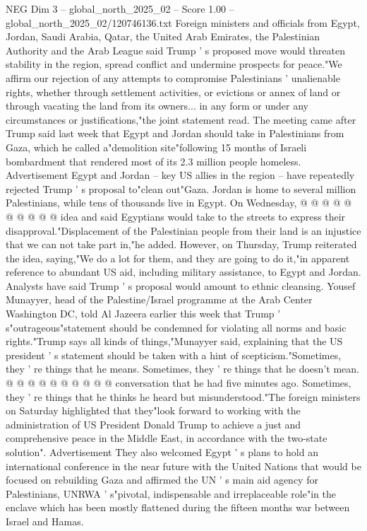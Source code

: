 \begin{textsample}{NEG Dim 3 – global\_north\_2025\_02 – Score 1.00 – global\_north\_2025\_02/120746136.txt}  \label{ex:f3_neg_172}
Foreign ministers and officials from Egypt, Jordan, Saudi Arabia, Qatar, the United Arab Emirates, the Palestinian Authority and the Arab League said Trump ' s proposed move would threaten stability in the region, spread conflict and undermine prospects for peace."We affirm our rejection of any attempts to compromise Palestinians ' unalienable rights, whether through settlement activities, or evictions or annex of land or through vacating the land from its owners... in any form or under any circumstances or justifications,"the joint statement read.
The meeting came after Trump said last week that Egypt and Jordan should take in Palestinians from Gaza, which he called a"demolition site"following 15 months of Israeli bombardment that rendered most of its 2.3 million people homeless.
Advertisement Egypt and Jordan -- key US allies in the region -- have repeatedly rejected Trump ' s proposal to"clean out"Gaza.
Jordan is home to several million Palestinians, while tens of thousands live in Egypt.
On Wednesday, @ @ @ @ @ @ @ @ @ @ idea and said Egyptians would take to the streets to express their disapproval."Displacement of the Palestinian people from their land is an injustice that we can not take part in,"he added.
However, on Thursday, Trump reiterated the idea, saying,"We do a lot for them, and they are going to do it,"in apparent reference to abundant US aid, including military assistance, to Egypt and Jordan.
Analysts have said Trump ' s proposal would amount to ethnic cleansing.
Yousef Munayyer, head of the Palestine/Israel programme at the Arab Center Washington DC, told Al Jazeera earlier this week that Trump ' s"outrageous"statement should be condemned for violating all norms and basic rights."Trump says all kinds of things,"Munayyer said, explaining that the US president ' s statement should be taken with a hint of scepticism."Sometimes, they ' re things that he means.
Sometimes, they ' re things that he doesn't mean. @ @ @ @ @ @ @ @ @ @ conversation that he had five minutes ago.
Sometimes, they ' re things that he thinks he heard but misunderstood."The foreign ministers on Saturday highlighted that they"look forward to working with the administration of US President Donald Trump to achieve a just and comprehensive peace in the Middle East, in accordance with the two-state solution".
Advertisement They also welcomed Egypt ' s plans to hold an international conference in the near future with the United Nations that would be focused on rebuilding Gaza and affirmed the UN ' s main aid agency for Palestinians, UNRWA ' s"pivotal, indispensable and irreplaceable role"in the enclave which has been mostly flattened during the fifteen months war between Israel and Hamas.

\end{textsample}
